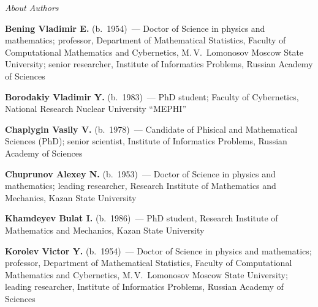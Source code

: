 \begin{center}\LARGE
\textit{About Authors}
\end{center}
\thispagestyle{empty}

\vspace*{24pt}

\begin{multicols}{2}



\noindent
\textbf{Bening Vladimir E.} (b.\ 1954)~--- Doctor of Science in physics and 
mathematics; professor, Department of Mathematical Statistics, Faculty of Computational 
Mathematics and Cybernetics, M.\,V.~Lomonosov Moscow State University; senior researcher, Institute of 
Informatics Problems, Russian Academy of Sciences
{

}

\vspace*{6pt}

\noindent
\textbf{Borodakiy Vladimir Y.} (b.\ 1983)~--- PhD student; Faculty of Cybernetics,
National Research Nuclear University ``MEPHI''

\vspace*{6pt}

\noindent
\textbf{Chaplygin Vasily V.} (b.\ 1978)~--- 
Candidate of
Phisical and Mathematical Sciences (PhD); 
senior scientist, Institute of Informatics
Problems, Russian Academy of Sciences

\vspace*{6pt}

\noindent
\textbf{Chuprunov Alexey N.} (b.\ 1953)~--- Doctor of Science in physics and mathematics;
leading researcher, Research Institute of Mathematics and Mechanics, Kazan
State University

\vspace*{6pt}

\noindent
\textbf{Khamdeyev Bulat I.} (b.\ 1986)~--- 
PhD student,   Research Institute of Mathematics and Mechanics, Kazan
State University

\vspace*{6pt}

\noindent
\textbf{Korolev Victor Y.} (b.\ 1954)~--- Doctor of Science in physics and 
mathematics; professor, Department of Mathematical Statistics, Faculty of Computational 
Mathematics and Cybernetics, M.\,V.~Lomonosov Moscow State University; leading researcher, Institute of 
Informatics Problems, Russian Academy of Sciences
{

}
\end{multicols}
